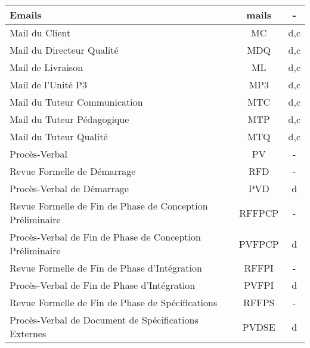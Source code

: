\begin{longtable}{|p{12cm}|c|c|}
    \hline
    \hspace{1cm} Emails & mails & -\\
    \hline
    \hspace{2cm} Mail du Client & MC & d,c\\
    \hline
    \hspace{2cm} Mail du Directeur Qualité & MDQ & d,c\\
    \hline
    \hspace{2cm} Mail de Livraison & ML & d,c\\
    \hline
    \hspace{2cm} Mail de l'Unité P3 & MP3 & d,c\\
    \hline
    \hspace{2cm} Mail du Tuteur Communication & MTC & d,c\\
    \hline
    \hspace{2cm} Mail du Tuteur Pédagogique & MTP & d,c\\
    \hline
    \hspace{2cm} Mail du Tuteur Qualité & MTQ & d,c\\
    \hline
    \hspace{1cm} Procès-Verbal & PV & -\\
    \hline
    \hspace{2cm} Revue Formelle de Démarrage & RFD & -\\
    \hline
    \hspace{3cm} Procès-Verbal de Démarrage & PVD & d\\
    \hline
    \hspace{2cm} Revue Formelle de Fin de Phase de Conception Préliminaire & RFFPCP & -\\
    \hline
    \hspace{3cm} Procès-Verbal de Fin de Phase de Conception Préliminaire & PVFPCP & d\\
    \hline
    \hspace{2cm} Revue Formelle de Fin de Phase d'Intégration & RFFPI & -\\
    \hline
    \hspace{3cm} Procès-Verbal de Fin de Phase d'Intégration & PVFPI & d\\
    \hline
    \hspace{2cm} Revue Formelle de Fin de Phase de Spécifications & RFFPS & -\\
    \hline
    \hspace{3cm} Procès-Verbal de Document de Spécifications Externes & PVDSE & d\\

\end{longtable}
